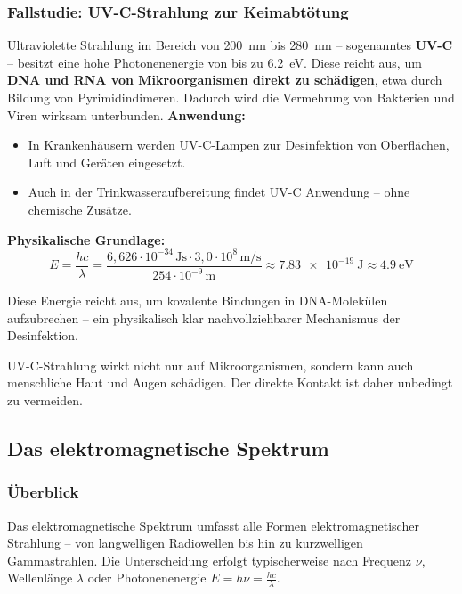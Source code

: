 \subsubsection{Fallstudie: UV-C-Strahlung zur Keimabtötung}

Ultraviolette Strahlung im Bereich von \SI{200}{nm} bis \SI{280}{nm} – sogenanntes \textbf{UV-C} – besitzt eine hohe Photonenenergie von bis zu \SI{6.2}{\electronvolt}. Diese reicht aus, um \textbf{DNA und RNA von Mikroorganismen direkt zu schädigen}, etwa durch Bildung von Pyrimidindimeren. Dadurch wird die Vermehrung von Bakterien und Viren wirksam unterbunden.
\newpage
\noindent
\textbf{Anwendung:}
\begin{itemize}
	\item In Krankenhäusern werden UV-C-Lampen zur Desinfektion von Oberflächen, Luft und Geräten eingesetzt.
	\item Auch in der Trinkwasseraufbereitung findet UV-C Anwendung – ohne chemische Zusätze.
\end{itemize}

\textbf{Physikalische Grundlage:}
\[
E = \frac{hc}{\lambda} = \frac{6{,}626 \cdot 10^{-34}\,\si{\joule\second} \cdot 3{,}0 \cdot 10^8\,\si{\meter\per\second}}{254 \cdot 10^{-9}\,\si{\meter}} \approx \SI{7.83e-19}{\joule} \approx \SI{4.9}{\electronvolt}
\]

Diese Energie reicht aus, um kovalente Bindungen in DNA-Molekülen aufzubrechen – ein physikalisch klar nachvollziehbarer Mechanismus der Desinfektion.
\vspace{0.5em}
\begin{tcolorbox}[physikbox, title=Hinweis zur Gefährdung]
	\label{box:Hinweis zur Gefärdung}
	UV-C-Strahlung wirkt nicht nur auf Mikroorganismen, sondern kann auch menschliche Haut und Augen schädigen. Der direkte Kontakt ist daher unbedingt zu vermeiden.
\end{tcolorbox}

\subsection{Das elektromagnetische Spektrum}

\subsubsection{Überblick}

Das elektromagnetische Spektrum umfasst alle Formen elektromagnetischer Strahlung – von langwelligen Radiowellen bis hin zu kurzwelligen Gammastrahlen. Die Unterscheidung erfolgt typischerweise nach Frequenz \(\nu\), Wellenlänge \(\lambda\) oder Photonenenergie \(E = h\nu = \frac{hc}{\lambda}\).
\newpage
\noindent
